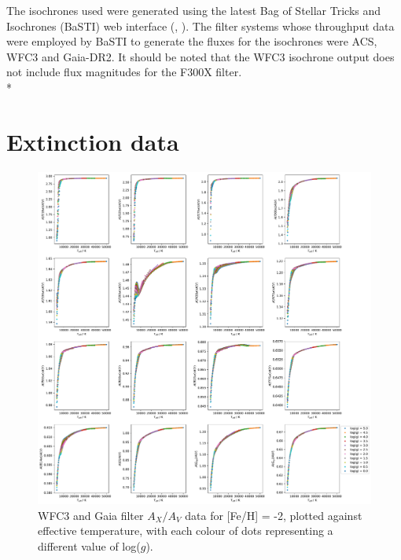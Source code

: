 \documentclass[12pt, a4paper]{report}
\begin{document}
The isochrones used were generated using the latest Bag of Stellar Tricks and Isochrones (BaSTI) web interface (\cite{2004ApJ...612..168P}, \cite{2018ApJ...856..125H}). The filter systems whose throughput data were employed by BaSTI to generate the fluxes for the isochrones were ACS, WFC3 and Gaia-DR2. It should be noted that the WFC3 isochrone output does not include flux magnitudes for the F300X filter.\\*

\section{Extinction data}

\begin{figure}[h]
\begin{center}
\includegraphics[scale=0.3]{../just_full_data/comb/AHub_FeHm2p0_just_Teff_fit_plot_dots.pdf}
\caption{WFC3 and Gaia filter $A_{X}/A_{V}$ data for [Fe/H] = -2, plotted against effective temperature, with each colour of dots representing a different value of log($g$).}
\label{comb Ax/Av data FeH=-2}
\end{center}
\end{figure}
\end{document}
